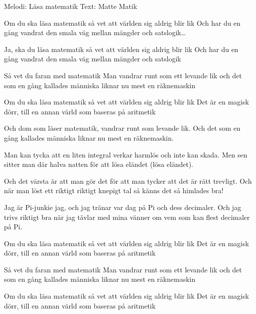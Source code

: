 \begin{song}
\begin{songmeta}
Melodi: Läsa matematik
Text: Matte Matik
\end{songmeta}
\begin{songtext}
Om du ska läsa matematik
så vet att världen sig aldrig blir lik
Och har du en gång vandrat den smala väg
mellan mängder och satslogik\ldots

Ja, ska du läsa matematik
så vet att världen sig aldrig blir lik
Och har du en gång vandrat den smala väg
mellan mängder och satslogik

Så vet du faran med matematik
Man vandrar runt som ett levande lik
och det som en gång kallades människa
liknar nu mest en räknemaskin

Om du ska läsa matematik
så vet att världen sig aldrig blir lik
Det är en magisk dörr, till en annan värld
som baseras på aritmetik

Och dom som läser matematik,
vandrar runt som levande lik.
Och det som en gång kallades människa
liknar nu mest en räknemaskin.

\newpage
Man kan tycka att en liten integral
verkar harmlös och inte kan skada.
Men sen sitter man där halva natten
för att lösa eländet (lösa eländet).

Och det värsta är att man gör det för
att man tycker att det är rätt trevligt.
Och när man löst ett riktigt riktigt knepigt tal
så känns det så himlades bra!

Jag är Pi-junkie jag, och jag tränar var dag
på Pi och dess decimaler.
Och jag trivs riktigt bra när jag tävlar med mina
vänner om vem som kan flest decimaler på Pi.

Om du ska läsa matematik
så vet att världen sig aldrig blir lik
Det är en magisk dörr, till en annan värld
som baseras på aritmetik

Så vet du faran med matematik
Man vandrar runt som ett levande lik
och det som en gång kallades människa
liknar nu mest en räknemaskin

Om du ska läsa matematik
så vet att världen sig aldrig blir lik
Det är en magisk dörr, till en annan värld
som baseras på aritmetik
\end{songtext}
\end{song}

